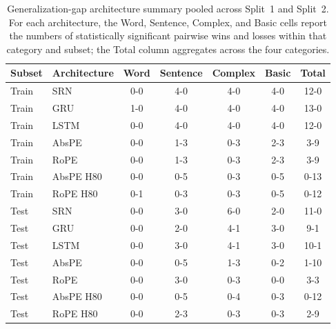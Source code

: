 \begin{table}[t]
\centering\scriptsize
\setlength{\tabcolsep}{3pt}
\begin{tabular}{@{}llccccc@{}}
\toprule
\textbf{Subset} & \textbf{Architecture} & \textbf{Word} & \textbf{Sentence} & \textbf{Complex} & \textbf{Basic} & \textbf{Total} \\
\midrule
Train & SRN & 0-0 & 4-0 & 4-0 & 4-0 & 12-0 \\
Train & GRU & 1-0 & 4-0 & 4-0 & 4-0 & 13-0 \\
Train & LSTM & 0-0 & 4-0 & 4-0 & 4-0 & 12-0 \\
Train & AbsPE & 0-0 & 1-3 & 0-3 & 2-3 & 3-9 \\
Train & RoPE & 0-0 & 1-3 & 0-3 & 2-3 & 3-9 \\
Train & AbsPE H80 & 0-0 & 0-5 & 0-3 & 0-5 & 0-13 \\
Train & RoPE H80 & 0-1 & 0-3 & 0-3 & 0-5 & 0-12 \\
Test & SRN & 0-0 & 3-0 & 6-0 & 2-0 & 11-0 \\
Test & GRU & 0-0 & 2-0 & 4-1 & 3-0 & 9-1 \\
Test & LSTM & 0-0 & 3-0 & 4-1 & 3-0 & 10-1 \\
Test & AbsPE & 0-0 & 0-5 & 1-3 & 0-2 & 1-10 \\
Test & RoPE & 0-0 & 3-0 & 0-3 & 0-0 & 3-3 \\
Test & AbsPE H80 & 0-0 & 0-5 & 0-4 & 0-3 & 0-12 \\
Test & RoPE H80 & 0-0 & 2-3 & 0-3 & 0-3 & 2-9 \\
\bottomrule
\end{tabular}
\caption{\small Generalization-gap architecture summary pooled across Split~1 and Split~2. For each architecture, the Word, Sentence, Complex, and Basic cells report the numbers of statistically significant pairwise wins and losses within that category and subset; the Total column aggregates across the four categories.}
\label{tab:gap_arch_dominance}
\end{table}
